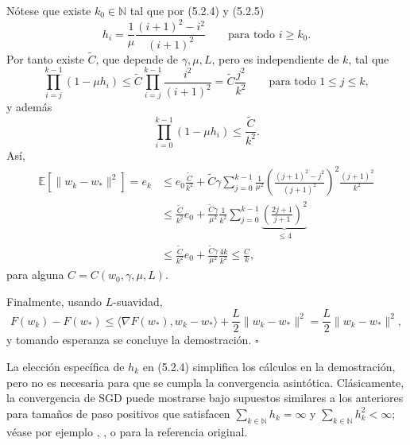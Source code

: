 \documentclass[11pt]{report}
\theoremstyle{definition}
\theoremstyle{plain}
\numberwithin{equation}{section}
\begin{document}
Nótese que existe \(k_0\in\mathbb{N}\) tal que por (5.2.4) y (5.2.5)
\begin{equation*}
    h_i
    =
    \frac{1}{\mu}
    \frac{(i+1)^2-i^2}{(i+1)^2}
    \qquad
    \text{para todo } i\geq k_0.
\end{equation*}
Por tanto existe \(\widetilde{C}\), que depende de \(\gamma,\mu,L\), pero es independiente de \(k\), tal que
\begin{equation*}
    \prod_{i=j}^{k-1}(1-\mu h_i)
    \leq
    \widetilde{C}
    \prod_{i=j}^{k-1}
    \frac{i^2}{(i+1)^2}
    =
    \widetilde{C}\frac{j^2}{k^2}
    \qquad
    \text{para todo } 1\leq j\leq k,
\end{equation*}
y además
\begin{equation*}
    \prod_{i=0}^{k-1}(1-\mu h_i)
    \leq
    \frac{\widetilde{C}}{k^2}.
\end{equation*}
Así,
\begin{align*}
    \mathbb{E}[\|w_k-w_*\|^2]
    =
    e_k
    &\leq
    e_0\frac{\widetilde{C}}{k^2}
    +
    \widetilde{C}\gamma
    \sum_{j=0}^{k-1}
    \frac{1}{\mu^2}
    \left(
        \frac{(j+1)^2-j^2}{(j+1)^2}
    \right)^2
    \frac{(j+1)^2}{k^2}\\
    &\leq
    \frac{\widetilde{C}}{k^2}e_0
    +
    \frac{\widetilde{C}\gamma}{\mu^2}
    \frac{1}{k^2}
    \sum_{j=0}^{k-1}
    \underbrace{
    \left(
        \frac{2j+1}{j+1}
    \right)^2
    }_{\leq 4}\\
    &\leq
    \frac{\widetilde{C}}{k^2}e_0
    +
    \frac{\widetilde{C}\gamma}{\mu^2}
    \frac{4k}{k^2}
    \leq
    \frac{C}{k},
\end{align*}
para alguna \(C=C(w_0,\gamma,\mu,L)\).

Finalmente, usando \(L\)-suavidad,
\begin{equation*}
    F(w_k)-F(w_*)
    \leq
    \langle\nabla F(w_*),w_k-w_*\rangle
    +
    \frac{L}{2}\|w_k-w_*\|^2
    =
    \frac{L}{2}\|w_k-w_*\|^2,
\end{equation*}
y tomando esperanza se concluye la demostración. \(\square\)

La elección específica de \(h_k\) en (5.2.4) simplifica los cálculos en la demostración, pero no es necesaria para que se cumpla la convergencia asintótica. Clásicamente, la convergencia de SGD puede mostrarse bajo supuestos similares a los anteriores para tamaños de paso positivos que satisfacen \(\sum_{k\in\mathbb{N}}h_k=\infty\) y \(\sum_{k\in\mathbb{N}}h_k^2<\infty\); véase por ejemplo \cite[Sección 4]{bottou-curtis-nocedal-2018}, \cite[Capítulo 4]{bubeck-2015}, o \cite{robbins-monro-1951} para la referencia original.
\end{document}
